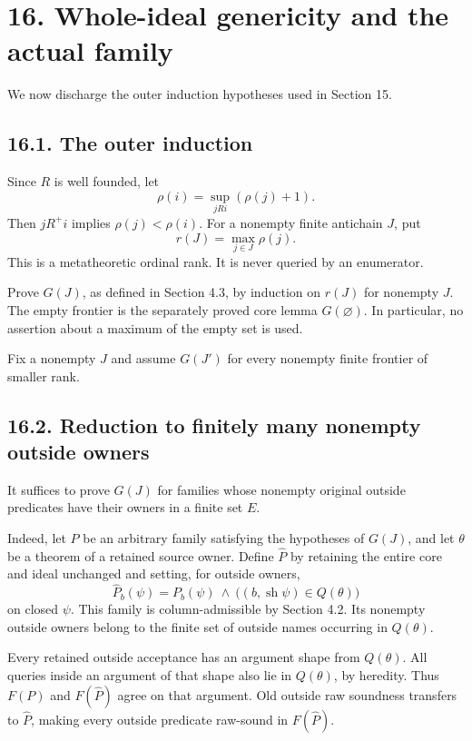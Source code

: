 \documentclass[
  11pt,
  letterpaper,
]{article}
\begin{document}
\section{16. Whole-ideal genericity and the actual
family}\label{whole-ideal-genericity-and-the-actual-family}

We now discharge the outer induction hypotheses used in Section 15.

\subsection{16.1. The outer induction}\label{the-outer-induction}

Since \(R\) is well founded, let \[
\rho(i)=\sup_{jRi}(\rho(j)+1).
\] Then \(jR^+i\) implies \(\rho(j)<\rho(i)\). For a nonempty finite
antichain \(J\), put \[
r(J)=\max_{j\in J}\rho(j).
\] This is a metatheoretic ordinal rank. It is never queried by an
enumerator.

Prove \(G(J)\), as defined in Section 4.3, by induction on \(r(J)\) for
nonempty \(J\). The empty frontier is the separately proved core lemma
\(G(\varnothing)\). In particular, no assertion about a maximum of the
empty set is used.

Fix a nonempty \(J\) and assume \(G(J')\) for every nonempty finite
frontier of smaller rank.

\subsection{16.2. Reduction to finitely many nonempty outside
owners}\label{reduction-to-finitely-many-nonempty-outside-owners}

It suffices to prove \(G(J)\) for families whose nonempty original
outside predicates have their owners in a finite set \(E\).

Indeed, let \(P\) be an arbitrary family satisfying the hypotheses of
\(G(J)\), and let \(\theta\) be a theorem of a retained source owner.
Define \(\widehat P\) by retaining the entire core and ideal unchanged
and setting, for outside owners, \[
\widehat P_b(\psi)=
P_b(\psi)\ \land\
\bigl((b,\operatorname{sh}\psi)\in Q(\theta)\bigr)
\] on closed \(\psi\). This family is column-admissible by Section 4.2.
Its nonempty outside owners belong to the finite set of outside names
occurring in \(Q(\theta)\).

Every retained outside acceptance has an argument shape from
\(Q(\theta)\). All queries inside an argument of that shape also lie in
\(Q(\theta)\), by heredity. Thus \(F(P)\) and \(F(\widehat P)\) agree on
that argument. Old outside raw soundness transfers to \(\widehat P\),
making every outside predicate raw-sound in \(F(\widehat P)\).
\end{document}
